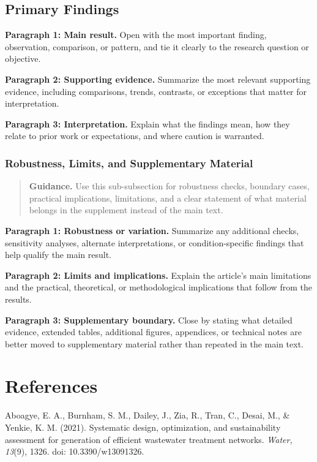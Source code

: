 \documentclass[a4paper,fleqn]{cas-sc}
\newcommand{\draftguidance}[1]{%
\begin{quote}
\small
\textbf{Guidance.} #1
\end{quote}
}
\begin{document}
\subsection{Primary Findings}

\noindent\textbf{Paragraph 1: Main result.} Open with the most important finding, observation, comparison, or pattern, and tie it clearly to the research question or objective.

\noindent\textbf{Paragraph 2: Supporting evidence.} Summarize the most relevant supporting evidence, including comparisons, trends, contrasts, or exceptions that matter for interpretation.

\noindent\textbf{Paragraph 3: Interpretation.} Explain what the findings mean, how they relate to prior work or expectations, and where caution is warranted.

\subsubsection{Robustness, Limits, and Supplementary Material}

\draftguidance{Use this sub-subsection for robustness checks, boundary cases, practical implications, limitations, and a clear statement of what material belongs in the supplement instead of the main text.}

\noindent\textbf{Paragraph 1: Robustness or variation.} Summarize any additional checks, sensitivity analyses, alternate interpretations, or condition-specific findings that help qualify the main result.

\noindent\textbf{Paragraph 2: Limits and implications.} Explain the article's main limitations and the practical, theoretical, or methodological implications that follow from the results.

\noindent\textbf{Paragraph 3: Supplementary boundary.} Close by stating what detailed evidence, extended tables, additional figures, appendices, or technical notes are better moved to supplementary material rather than repeated in the main text.

\section*{References}

\noindent Aboagye, E. A., Burnham, S. M., Dailey, J., Zia, R., Tran, C., Desai, M., \& Yenkie, K. M. (2021). Systematic design, optimization, and sustainability assessment for generation of efficient wastewater treatment networks. \textit{Water, 13}(9), 1326. doi: 10.3390/w13091326.
\end{document}

